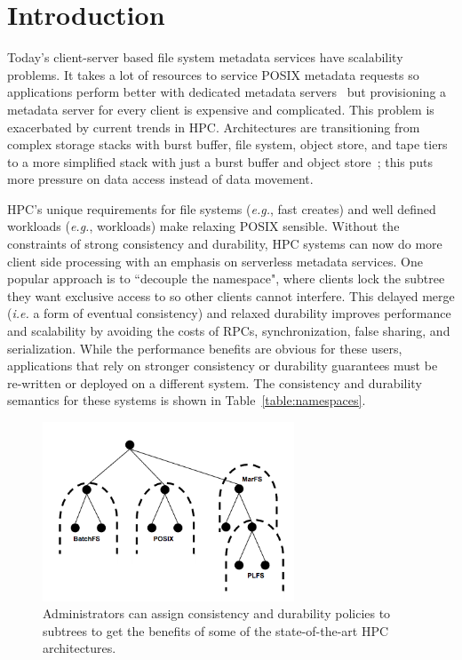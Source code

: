 \section{Introduction}

Today's client-server based file system metadata services have scalability
problems. It takes a lot of resources to service POSIX metadata requests so
applications perform better with dedicated metadata
servers~\cite{sevilla:sc15-mantle, ren:sc2014-indexfs} but provisioning a
metadata server for every client is expensive and complicated. This problem is
exacerbated by current trends in HPC.  Architectures are transitioning from
complex storage stacks with burst buffer, file system, object store, and tape
tiers to a more simplified stack with just a burst buffer and object
store~\cite{bent:login16-hpc-trends}; this puts more pressure on data access
instead of data movement.

HPC's unique requirements for file systems ({\it e.g.}, fast creates) and well
defined workloads ({\it e.g.}, workloads) make relaxing POSIX sensible. Without
the constraints of strong consistency and durability, HPC systems can now do
more client side processing with an emphasis on serverless metadata services.
One popular approach is to ``decouple the namespace", where clients lock the
subtree they want exclusive access to so other clients cannot interfere. This
delayed merge ({\it i.e.} a form of eventual consistency) and relaxed
durability improves performance and scalability by avoiding the costs of RPCs,
synchronization, false sharing, and serialization.  While the performance
benefits are obvious for these users, applications that rely on stronger
consistency or durability guarantees must be re-written or deployed on a
different system. The consistency and durability semantics for these systems is
shown in Table~\ref{table:namespaces}.

\begin{figure}[tb]
\centering
\includegraphics[width=75mm]{figures/subtree-policies.png}
\caption{Administrators can assign consistency and durability policies to
subtrees to get the benefits of some of the state-of-the-art HPC architectures.
}\label{fig:subtree-policies}
\end{figure}

